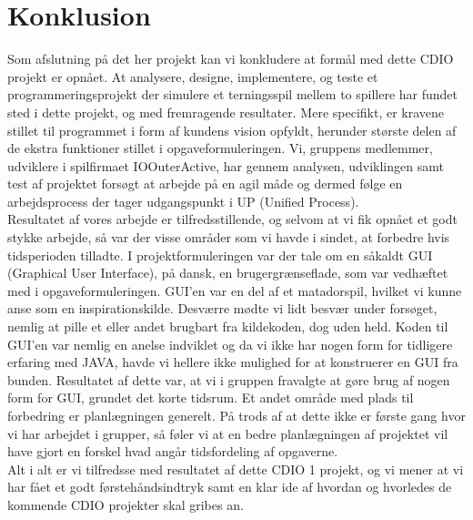 \chapter{Konklusion}
Som afslutning på det her projekt kan vi konkludere at formål med dette CDIO projekt er opnået. At analysere, designe, implementere, og teste et programmeringsprojekt der simulere et terningsspil mellem to spillere har fundet sted i dette projekt, og med fremragende resultater. Mere specifikt, er kravene stillet til programmet i form af kundens vision opfyldt, herunder største delen af de ekstra funktioner stillet i opgaveformuleringen. Vi, gruppens medlemmer, udviklere i spilfirmaet IOOuterActive, har gennem analysen, udviklingen samt test af projektet forsøgt at arbejde på en agil måde og dermed følge en arbejdsprocess der tager udgangspunkt i UP (Unified Process). \\

Resultatet af vores arbejde er tilfredsstillende, og selvom at vi fik opnået et godt stykke arbejde, så var der visse områder som vi havde i sindet, at forbedre hvis tidsperioden tilladte. I projektformuleringen var der tale om en såkaldt GUI (Graphical User Interface), på dansk, en brugergrænseflade, som var vedhæftet med i opgaveformuleringen. GUI’en var en del af et matadorspil, hvilket vi kunne anse som en inspirationskilde. Desværre mødte vi lidt besvær under forsøget, nemlig at pille et eller andet brugbart fra kildekoden, dog uden held. Koden til GUI’en var nemlig en anelse indviklet og da vi ikke har nogen form for tidligere erfaring med JAVA, havde vi hellere ikke mulighed for at konstruerer en GUI fra bunden. Resultatet af dette var, at vi i gruppen fravalgte at gøre brug af nogen form for GUI, grundet det korte tidsrum. Et andet område med plads til forbedring er planlægningen generelt. På trods af at dette ikke er første gang hvor vi har arbejdet i grupper, så føler vi at en bedre planlægningen af projektet vil have gjort en forskel hvad angår tidsfordeling af opgaverne. \\

Alt i alt er vi tilfredsse med resultatet af dette CDIO 1 projekt, og vi mener at vi har fået et godt førstehåndsindtryk samt en klar ide af hvordan og hvorledes de kommende CDIO projekter skal gribes an.